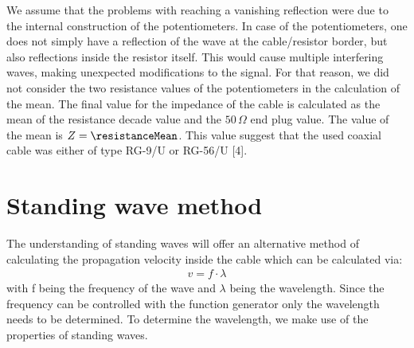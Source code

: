 \documentclass[a4paper,10pt,twocolumn]{article}
\begin{document}
    We assume that the problems with reaching a vanishing reflection were due to the internal construction of the potentiometers.
    In case of the potentiometers, one does not simply have a reflection of the wave at the cable/resistor border, but also reflections inside the resistor itself.
    This would cause multiple interfering waves, making unexpected modifications to the signal.
    For that reason, we did not consider the two resistance values of the potentiometers in the calculation of the mean.
    The final value for the impedance of the cable is calculated as the mean of the resistance decade value and the $50\,\Omega$ end plug value.
    The value of the mean is $Z = \resistanceMean$.
    This value suggest that the used coaxial cable was either of type RG-9/U or RG-56/U [4].
    
    \section{Standing wave method}
    \label{subsec:standingWaveMethod}
    The understanding of standing waves will offer an alternative method of calculating the propagation velocity inside the cable which can be calculated via:
    \begin{align}
        \label{eq:velocityStanding}
        v = f\cdot\lambda
        \end{align}
    with f being the frequency of the wave and $\lambda$ being the wavelength.
    Since the frequency can be controlled with the function generator only the wavelength needs to be determined.
    To determine the wavelength, we make use of the properties of standing waves. 
    
\end{document}
